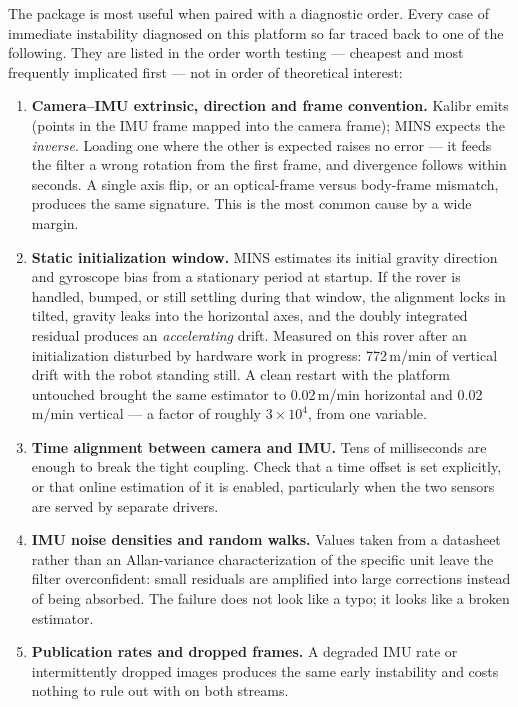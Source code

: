 The package is most useful when paired with a diagnostic order. Every case of
immediate instability diagnosed on this platform so far traced back to one of
the following. They are listed in the order worth testing --- cheapest and most
frequently implicated first --- not in order of theoretical interest:

\begin{enumerate}
  \item \textbf{Camera--IMU extrinsic, direction and frame convention.}
  Kalibr emits  (points in the IMU frame mapped into the
  camera frame); MINS expects the \emph{inverse}. Loading one where the other
  is expected raises no error --- it feeds the filter a wrong rotation from the
  first frame, and divergence follows within seconds. A single axis flip, or an
  optical-frame versus body-frame mismatch, produces the same signature. This
  is the most common cause by a wide margin.

  \item \textbf{Static initialization window.} MINS estimates its initial
  gravity direction and gyroscope bias from a stationary period at startup.
  If the rover is handled, bumped, or still settling during that window, the
  alignment locks in tilted, gravity leaks into the horizontal axes, and the
  doubly integrated residual produces an \emph{accelerating} drift. Measured on
  this rover after an initialization disturbed by hardware work in progress:
  772\,m/min of vertical drift with the robot standing still.
  A clean restart with the platform untouched brought the same estimator to
  0.02\,m/min horizontal and 0.02\,m/min
  vertical --- a factor of roughly $3\times10^{4}$, from one variable.

  \item \textbf{Time alignment between camera and IMU.} Tens of milliseconds
  are enough to break the tight coupling. Check that a time offset is set
  explicitly, or that online estimation of it is enabled, particularly when the
  two sensors are served by separate drivers.

  \item \textbf{IMU noise densities and random walks.} Values taken from a
  datasheet rather than an Allan-variance characterization of the specific unit
  leave the filter overconfident: small residuals are amplified into large
  corrections instead of being absorbed. The failure does not look like a typo;
  it looks like a broken estimator.

  \item \textbf{Publication rates and dropped frames.} A degraded IMU rate or
  intermittently dropped images produces the same early instability and costs
  nothing to rule out with  on both streams.
\end{enumerate}

